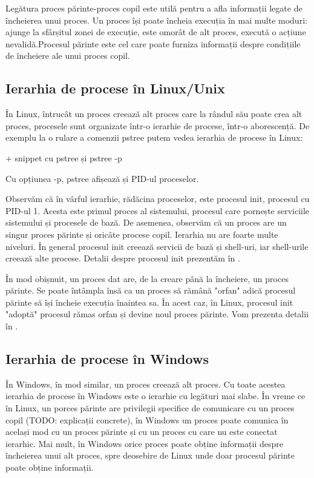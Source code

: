 Legătura proces părinte-proces copil este utilă pentru a afla informații legate
de încheierea unui proces. Un proces își poate încheia execuția în mai multe
moduri: ajunge la sfârșitul zonei de execuție, este omorât de alt proces,
execută o acțiune nevalidă.Procesul părinte este cel care poate furniza
informații despre condițiile de încheiere ale unui proces copil.

\subsection{Ierarhia de procese în Linux/Unix}
\label{sec:procese-ierarhie-linux}

În Linux, întrucât un proces creează alt proces care la rândul său poate crea
alt proces, procesele sunt organizate într-o ierarhie de procese, într-o
aborescență. De exemplu la o rulare a comenzii pstree putem vedea ierarhia de
procese în Linux:

+ snippet cu pstree și pstree -p

Cu opțiunea -p, pstree afișează și PID-ul proceselor.

Observăm că în vârful ierarhie, rădăcina proceselor, este procesul init,
procesul cu PID-ul 1. Acesta este primul proces al sistemului, procesul care
pornește serviciile sistemului și procesele de bază. De asemenea, observăm că un
proces are un singur proces părinte și oricâte procese copil. Ierarhia nu are
foarte multe niveluri. În general procesul init creează servicii de bază și
shell-uri, iar shell-urile creează alte procese. Detalii despre procesul init
prezentăm în .

În mod obișnuit, un proces dat are, de la creare până la încheiere, un proces
părinte. Se poate întâmpla însă ca un proces să rămână "orfan" adică procesul
părinte să își încheie execuția înaintea sa. În acest caz, în Linux, procesul
init "adoptă" procesul rămas orfan și devine noul proces părinte. Vom prezenta
detalii în .

\subsection{Ierarhia de procese în Windows}
\label{sec:procese-ierarhie-windows}

În Windows, în mod similar, un proces creează alt proces. Cu toate acestea
ierarhia de procese în Windows este o ierarhie cu legături mai slabe. În vreme
ce în Linux, un porces părinte are privilegii specifice de comunicare cu un
proces copil (TODO: explicații concrete), în Windows un proces poate comunica în
același mod cu un proces părinte și cu un proces cu care nu este conectat
ierarhic. Mai mult, în Windows orice proces poate obține informații despre
încheierea unui alt proces, spre deosebire de Linux unde doar procesul părinte
poate obține informații.

